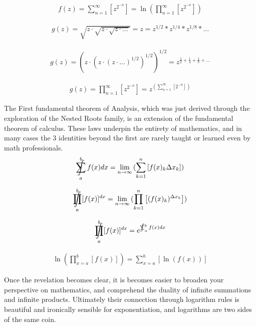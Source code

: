 \documentclass{article}
\DeclareMathOperator*{\SumInt}{%
\mathchoice%
  {\ooalign{$\displaystyle\sum$\cr\hidewidth$\displaystyle\int$\hidewidth\cr}}
  {\ooalign{\raisebox{.14\height}{\scalebox{.7}{$\textstyle\sum$}}\cr\hidewidth$\textstyle\int$\hidewidth\cr}}
  {\ooalign{\raisebox{.2\height}{\scalebox{.6}{$\scriptstyle\sum$}}\cr$\scriptstyle\int$\cr}}
  {\ooalign{\raisebox{.2\height}{\scalebox{.6}{$\scriptstyle\sum$}}\cr$\scriptstyle\int$\cr}}
}
\DeclareMathOperator*{\ProdInt}{%
\mathchoice%
  {\ooalign{$\displaystyle\prod$\cr\hidewidth$\displaystyle\int$\hidewidth\cr}}
  {\ooalign{\raisebox{.14\height}{\scalebox{.7}{$\textstyle\prod$}}\cr\hidewidth$\textstyle\int$\hidewidth\cr}}
  {\ooalign{\raisebox{.2\height}{\scalebox{.6}{$\scriptstyle\prod$}}\cr$\scriptstyle\int$\cr}}
  {\ooalign{\raisebox{.2\height}{\scalebox{.6}{$\scriptstyle\prod$}}\cr$\scriptstyle\int$\cr}}
}
\newcommand{\sidesum}[2]{\displaystyle\sum\nolimits_{\scriptstyle #1}^{\scriptstyle #2}}
\begin{document}
\begin{align*}
f(z) = \sum_{n=1}^{\infty} \left[z^{2^{-n}}\right] = \ln\left(\prod_{n=1}^{\infty} \left[z^{2^{-n}}\right]\right)
\end{align*}

\begin{align*}
g(z) = \sqrt{z \cdot \sqrt{z \cdot \sqrt{z \cdot \ldots}}} = z = z^{1/2} * z^{1/4} * z^{1/8} * \ldots
\end{align*}

\begin{align*}
g(z) = \left(z \cdot \left(z \cdot \left(z \cdot \ldots\right)^{1/2}\right)^{1/2}\right)^{1/2} = z^{\frac{1}{2} + \frac{1}{4} + \frac{1}{8} + \ldots}
\end{align*}

\begin{align*}
g(z) = \prod_{n=1}^{\infty} \left[z^{2^{-n}}\right] = z^{(\sidesum{n=1}{\infty}[2^{-n}])}
\end{align*}

The First fundamental theorem of Analysis, which was just derived through the exploration of the Nested Roots family, is an extension of the fundamental theorem of calculus. These laws underpin the entirety of mathematics, and in many cases the 3 identities beyond the first are rarely taught or learned even by math professionals.
\begin{align*}
\SumInt_{a}^{b} f(x) dx = \lim_{n \to \infty}{(\sum_{k=1}^{n} \left[f(x)_{k}\Delta x_{k} \right])}
\end{align*}

\begin{align*}
\ProdInt_{a}^{b} [ f(x) ]^{dx} = \lim_{n \to \infty}{(\prod_{k=1}^{n} \left[(f(x)_{k})^{\Delta x_{k}} \right])}
\end{align*}

\begin{align*}
\ProdInt_{a}^{b} [ f(x) ]^{dx} = e^{\SumInt_{a}^{b} f(x) dx}
\end{align*}

\begin{align*}
\ln(\prod_{x=a}^{b} [f(x)])= \sum_{x=a}^{b} [\ln(f(x))]
\end{align*}

Once the revelation becomes clear, it is becomes easier to broaden your perspective on mathematics, and comprehend the duality of infinite summations and infinite products. Ultimately their connection through logarithm rules is beautiful and ironically sensible for exponentiation, and logarithms are two sides of the same coin.
\end{document}
